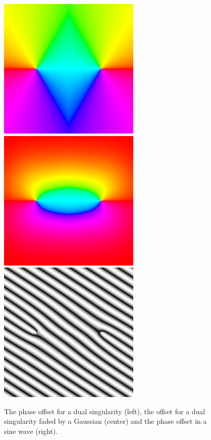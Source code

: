 \documentclass{utue} %
\begin{document}
\begin{figure}[h]
  \centering
  \includegraphics[width=0.3\linewidth]{images/dualSingularityPhase}
  \includegraphics[width=0.3\linewidth]{images/dualSingularityFaded}
  \includegraphics[width=0.3\linewidth]{images/dualSingularitySineWave}
  \caption{The phase offset for a dual singularity (left), the offset for a dual singularity faded by a Gaussian (center) and the phase offset in a sine wave (right).}\label{fig:dualSingularity}
\end{figure}



\printbibliography
\end{document}
